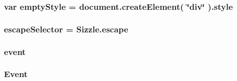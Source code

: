 \subsubsection[{\texorpdfstring{empty\+Style}{emptyStyle}}]{\setlength{\rightskip}{0pt plus 5cm}var empty\+Style = document.\+create\+Element( \char`\"{}div\char`\"{} ).style}\hypertarget{jquery-3_82_81_8js_a9026d1a3ba8848668d3ef83ef6142c81}{}\label{jquery-3_82_81_8js_a9026d1a3ba8848668d3ef83ef6142c81}
\subsubsection[{\texorpdfstring{escape\+Selector}{escapeSelector}}]{ escape\+Selector = Sizzle.\+escape}\hypertarget{jquery-3_82_81_8js_a011c656b1466dd95d1eacbde81097da5}{}\label{jquery-3_82_81_8js_a011c656b1466dd95d1eacbde81097da5}
\subsubsection[{\texorpdfstring{event}{event}}]{ event}\hypertarget{jquery-3_82_81_8js_a2ece9eec3df1cd48d8203e336e83563e}{}\label{jquery-3_82_81_8js_a2ece9eec3df1cd48d8203e336e83563e}
\subsubsection[{\texorpdfstring{Event}{Event}}]{ Event}\hypertarget{jquery-3_82_81_8js_a2cc2bb482e56b47f47b4ee54d670a418}{}\label{jquery-3_82_81_8js_a2cc2bb482e56b47f47b4ee54d670a418}
